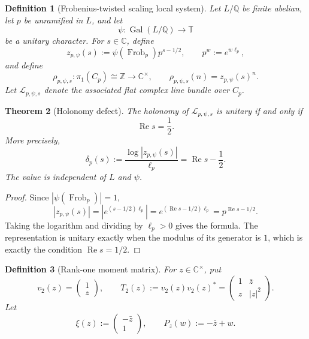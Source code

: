 \documentclass[11pt]{article}
\newtheorem{definition}{Definition}
\newtheorem{theorem}[definition]{Theorem}
\newcommand{\C}{\mathbb C}
\newcommand{\Z}{\mathbb Z}
\newcommand{\T}{\mathbb T}
\newcommand{\Frob}{\operatorname{Frob}}
\begin{document}
\begin{definition}[Frobenius-twisted scaling local system]
Let $L/\mathbb Q$ be finite abelian, let $p$ be unramified in $L$, and let
\[
 \psi:\operatorname{Gal}(L/\mathbb Q)\longrightarrow\T
\]
be a unitary character.  For $s\in\C$, define
\[
 z_{p,\psi}(s):=\psi(\Frob_p)p^{s-1/2},
 \qquad
 p^w:=e^{w\ell_p},
\]
and define
\[
 \rho_{p,\psi,s}:\pi_1(C_p)\cong\Z\longrightarrow\C^\times,
 \qquad
 \rho_{p,\psi,s}(n)=z_{p,\psi}(s)^n.
\]
Let $\mathcal L_{p,\psi,s}$ denote the associated flat complex line bundle over $C_p$.
\end{definition}

\begin{theorem}[Holonomy defect]
The holonomy of $\mathcal L_{p,\psi,s}$ is unitary if and only if
\[
 \operatorname{Re}s=\frac12.
\]
More precisely,
\[
 \delta_p(s):=\frac{\log|z_{p,\psi}(s)|}{\ell_p}
 =\operatorname{Re}s-\frac12.
\]
The value is independent of $L$ and $\psi$.
\end{theorem}

\begin{proof}
Since $|\psi(\Frob_p)|=1$,
\[
 |z_{p,\psi}(s)|
 =\left|e^{(s-1/2)\ell_p}\right|
 =e^{(\operatorname{Re}s-1/2)\ell_p}
 =p^{\operatorname{Re}s-1/2}.
\]
Taking the logarithm and dividing by $\ell_p>0$ gives the formula.  The representation is unitary exactly when the modulus of its generator is $1$, which is exactly the condition $\operatorname{Re}s=1/2$.
\end{proof}

\begin{definition}[Rank-one moment matrix]
For $z\in\C^\times$, put
\[
 v_2(z)=\begin{pmatrix}1\\z\end{pmatrix},
 \qquad
 T_2(z):=v_2(z)v_2(z)^*
 =\begin{pmatrix}1&\bar z\\z&|z|^2\end{pmatrix}.
\]
Let
\[
 \xi(z):=\begin{pmatrix}-\bar z\\1\end{pmatrix},
 \qquad
 P_z(w):=-\bar z+w.
\]
\end{definition}
\end{document}
